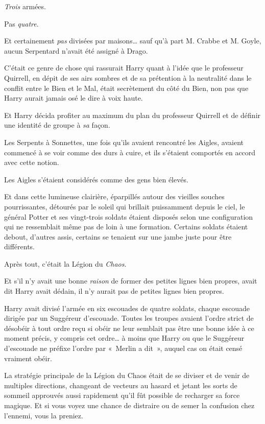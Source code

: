 \emph{Trois} armées.

Pas \emph{quatre}.

Et certainement \emph{pas} divisées par maisons… sauf qu'à part M. Crabbe et M. Goyle, aucun Serpentard n'avait été assigné à Drago.

C'était ce genre de chose qui rassurait Harry quant à l'idée que le professeur Quirrell, en dépit de ses airs sombres et de sa prétention à la neutralité dans le conflit entre le Bien et le Mal, était secrètement du côté du Bien, non pas que Harry aurait jamais osé le dire à voix haute.

Et Harry décida profiter au maximum du plan du professeur Quirrell et de définir une identité de groupe à \emph{sa} façon.

Les Serpents à Sonnettes, une fois qu'ils avaient rencontré les Aigles, avaient commencé à se voir comme des durs à cuire, et ils s'étaient comportés en accord avec cette notion.

Les Aigles s'étaient considérés comme des gens bien élevés.

Et dans cette lumineuse clairière, éparpillés autour des vieilles souches pourrissantes, détourés par le soleil qui brillait puissamment depuis le ciel, le général Potter et ses vingt-trois soldats étaient disposés selon une configuration qui ne ressemblait même pas de loin à une formation.
Certains soldats étaient debout, d'autres assis, certains se tenaient sur une jambe juste pour être différents.

Après tout, c'était la Légion du \emph{Chaos}.

Et s'il n'y avait une bonne \emph{raison} de former des petites lignes bien propres, avait dit Harry avait dédain, il n'y aurait pas de petites lignes bien propres.

Harry avait divisé l'armée en six escouades de quatre soldats, chaque escouade dirigée par un Suggéreur d'escouade.
Toutes les troupes avaient l'ordre strict de désobéir à tout ordre reçu si obéir ne leur semblait pas être une bonne idée à ce moment précis, y compris cet ordre… à moins que Harry ou que le Suggéreur d'escouade ne préfixe l'ordre par «~Merlin a dit~», auquel cas on était censé vraiment obéir.

La stratégie principale de la Légion du Chaos était de se diviser et de venir de multiples directions, changeant de vecteurs au hasard et jetant les sorts de sommeil approuvés aussi rapidement qu'il fût possible de recharger sa force magique.
Et si vous voyez une chance de distraire ou de semer la confusion chez l'ennemi, vous la preniez.

